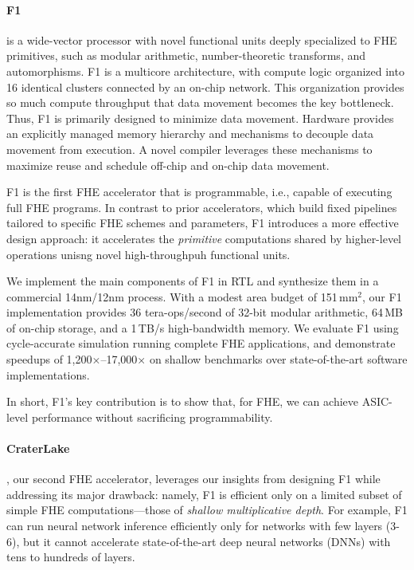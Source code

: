 \paragraph{F1} is a wide-vector processor with novel functional units deeply
specialized to FHE primitives, such as modular arithmetic, number-theoretic
transforms, and automorphisms. F1 is a multicore architecture, with compute
logic organized into 16 identical clusters connected by an on-chip network.
This organization provides so much compute throughput that data movement
becomes the key bottleneck. Thus, F1 is primarily designed to minimize data
movement. Hardware provides an explicitly managed memory hierarchy and
mechanisms to decouple data movement from execution. A novel compiler leverages
these mechanisms to maximize reuse and schedule off-chip and on-chip data
movement.

F1 is the first FHE accelerator that is programmable, i.e., capable of executing
full FHE programs. In contrast to prior accelerators, which build fixed pipelines
tailored to specific FHE schemes and parameters, F1 introduces a more effective
design approach: it accelerates the \emph{primitive} computations shared by
higher-level operations unisng novel high-throughpuh functional units.

We implement the main components of F1 in RTL and synthesize them in a
commercial 14nm/12nm process. With a modest area budget of 151\,mm$^2$, our F1
implementation provides 36 tera-ops/second of 32-bit modular arithmetic, 64\,MB
of on-chip storage, and a 1\,TB/s high-bandwidth memory. We evaluate F1 using
cycle-accurate simulation running complete FHE applications, and demonstrate
speedups of 1,200$\times$--17,000$\times$ on shallow benchmarks over
state-of-the-art software implementations.

In short, F1's key contribution is to show that, for FHE, we can achieve
ASIC-level performance without sacrificing programmability.


\paragraph{CraterLake}, our second FHE accelerator, leverages our insights from
designing F1 while addressing its major drawback: namely, F1 is efficient only
on a limited subset of simple FHE computations---those of \emph{shallow
multiplicative depth}. For example, F1 can run neural network inference
efficiently only for networks with few layers (3-6), but it cannot accelerate
state-of-the-art deep neural networks (DNNs) with tens to hundreds of layers.

